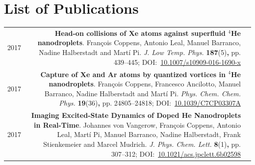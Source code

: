\chapter{List of Publications}
	\begin{tabular}{l!{\VRule}Rc}
		2017 & \textbf{Head-on collisions of {Xe} atoms against superfluid $^4${H}e nanodroplets}. Fran\c{c}ois Coppens, Antonio Leal, Manuel Barranco, Nadine Halberstadt and Mart\'{i} Pi. \emph{J. Low Temp. Phys.} \textbf{187}(5)\textbf{,} pp. 439--445; DOI:~\href{https://doi.org/10.1007/s10909-016-1690-x}{10.1007/s10909-016-1690-x}&\vspace{20pt}\\
		2017 & \textbf{Capture of Xe and Ar atoms by quantized vortices in $^4$He nanodroplets}. Fran\c{c}ois Coppens, Francesco Ancilotto, Manuel Barranco, Nadine Halberstadt and Mart\'{i} Pi. \emph{Phys. Chem. Chem. Phys.} \textbf{19}(36)\textbf{,} pp. 24805--24818; DOI:~\href{http://dx.doi.org/10.1039/C7CP03307A}{10.1039/C7CP03307A}&\vspace{20pt}\\
		2017 & \textbf{Imaging Excited-State Dynamics of Doped He Nanodroplets in Real-Time}. Johannes von Vangerow, Fran\c{c}ois Coppens, Antonio Leal, Mart\'{i} Pi, Manuel Barranco, Nadine Halberstadt, Frank Stienkemeier and Marcel Mudrich. \emph{J. Phys. Chem. Lett.} \textbf{8}(1)\textbf{,} pp. 307--312; DOI:~\href{http://dx.doi.org/10.1021/acs.jpclett.6b02598}{10.1021/acs.jpclett.6b02598}&\vspace{20pt}\\

\end{tabular}
